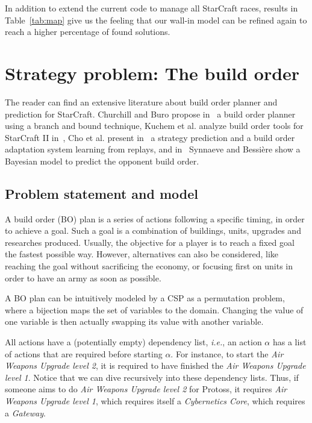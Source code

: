 \documentclass[journal]{IEEEtran}
\newcommand{\csp}{\textsc{CSP}\xspace}
\newcommand{\ie}{\textit{i.e.}}
\begin{document}
In addition to extend the current  code to manage all StarCraft races,
results in  Table~\ref{tab:map} give us  the feeling that  our wall-in
model  can be  refined again  to reach  a higher  percentage of  found
solutions.


\section{Strategy problem: The build order}\label{sec:bo}

The reader can find an  extensive literature about build order planner
and   prediction  for   StarCraft.  Churchill   and  Buro   propose
in~\cite{ChurchillB11} a build order planner  using a branch and bound
technique, Kuchem  et al. analyze  build order tools for  StarCraft II
in~\cite{KuchemPR13},  Cho  et  al.    present  in~\cite{ChoKC13}  a
strategy prediction  and a build  order adaptation system  learning from
replays, and  in~\cite{SynnaeveB11-a} Synnaeve and Bessi{\`e}re  show a
Bayesian model to predict the opponent build order.

\subsection{Problem statement and model}
A build order (BO) plan is a series of actions following a specific
timing, in order to  achieve a goal.  Such a goal  is a combination of
buildings,  units, upgrades  and  researches  produced.  Usually,  the
objective for a  player is to reach a fixed  goal the fastest possible
way. However, alternatives  can also be considered,  like reaching the
goal without sacrificing  the economy, or focusing first  on units in
order to have an army as soon as possible.

A  BO  plan can  be intuitively  modeled by  a \csp  as a
permutation problem,  where a bijection  maps the set of  variables to
the  domain. Changing  the  value  of one  variable  is then  actually
swapping its value with another variable.

All actions have a (potentially empty) dependency list, \ie, an action
$\alpha$  has a  list of  actions  that are  required before  starting
$\alpha$.   For instance,  to  start the  \textit{Air Weapons  Upgrade
  level 2},  it is required  to have finished the  \textit{Air Weapons
  Upgrade level  1}. Notice  that we can  dive recursively  into these
dependency  lists.  Thus,  if someone  aims to  do \textit{Air  Weapons
  Upgrade  level  2}  for  Protoss, it  requires  \textit{Air  Weapons
  Upgrade level 1}, which requires itself a \textit{Cybernetics Core},
which requires a \textit{Gateway}.
\end{document}
